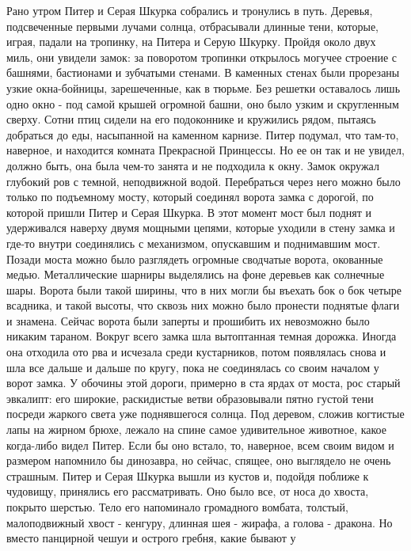     Рано утром Питер и Серая Шкурка собрались и тронулись в путь. 
Деревья, подсвеченные первыми лучами солнца, отбрасывали длинные тени, 
которые, играя, падали на тропинку, на Питера и Серую Шкурку.
    Пройдя около двух миль, они увидели замок: за поворотом тропинки 
открылось могучее строение с башнями, бастионами и зубчатыми стенами. 
В каменных стенах были прорезаны узкие окна-бойницы, зарешеченные, как 
в тюрьме. Без решетки оставалось лишь одно окно - под самой крышей 
огромной башни, оно было узким и скругленным сверху. Сотни птиц сидели 
на его подоконнике и кружились рядом, пытаясь добраться до еды, 
насыпанной на каменном карнизе. Питер подумал, что там-то, наверное, и 
находится комната Прекрасной Принцессы. Но ее он так и не увидел, 
должно быть, она была чем-то занята и не подходила к окну.
    Замок окружал глубокий ров с темной, неподвижной водой. 
Перебраться через него можно было только по подъемному мосту, который 
соединял ворота замка с дорогой, по которой пришли Питер и Серая 
Шкурка. В этот момент мост был поднят и удерживался наверху двумя 
мощными цепями, которые уходили в стену замка и где-то внутри 
соединялись с механизмом, опускавшим и поднимавшим мост.
    Позади моста можно было разглядеть огромные сводчатые ворота, 
окованные медью. Металлические шарниры выделялись на фоне деревьев как 
солнечные шары. Ворота были такой ширины, что в них могли бы въехать 
бок о бок четыре всадника, и такой высоты, что сквозь них можно было 
пронести поднятые флаги и знамена. Сейчас ворота были заперты и 
прошибить их невозможно было никаким тараном.
    Вокруг всего замка шла вытоптанная темная дорожка. Иногда она 
отходила ото рва и исчезала среди кустарников, потом появлялась снова 
и шла все дальше и дальше по кругу, пока не соединялась со своим 
началом у ворот замка. У обочины этой дороги, примерно в ста ярдах от 
моста, рос старый эвкалипт: его широкие, раскидистые ветви 
образовывали пятно густой тени посреди жаркого света уже поднявшегося 
солнца.
    Под деревом, сложив когтистые лапы на жирном брюхе, лежало на 
спине самое удивительное животное, какое когда-либо видел Питер. Если 
бы оно встало, то, наверное, всем своим видом и размером напомнило бы 
динозавра, но сейчас, спящее, оно выглядело не очень страшным.
    Питер и Серая Шкурка вышли из кустов и, подойдя поближе к 
чудовищу, принялись его рассматривать. Оно было все, от носа до 
хвоста, покрыто шерстью. Тело его напоминало громадного вомбата, 
толстый, малоподвижный хвост - кенгуру, длинная шея - жирафа, а голова 
- дракона. Но вместо панцирной чешуи и острого гребня, какие бывают у 
